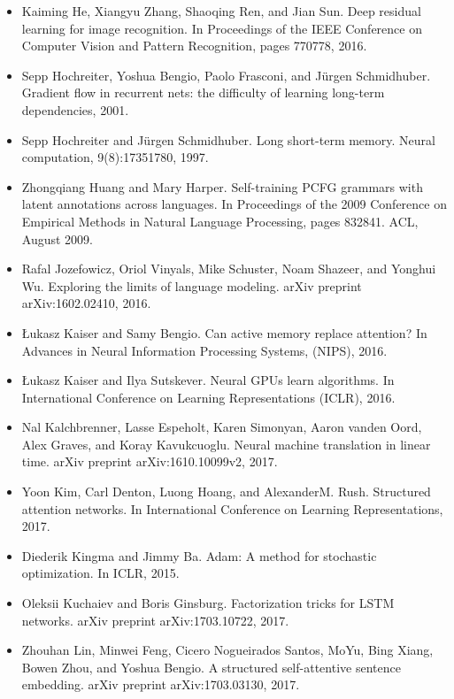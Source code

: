 \documentclass[11pt,a4paper]{article}
\begin{document}
\begin{itemize}
\item [he2016deep] Kaiming He, Xiangyu Zhang, Shaoqing Ren, and Jian Sun. Deep residual learning for image recognition. In Proceedings of the IEEE Conference on Computer Vision and Pattern Recognition, pages 770778, 2016.
\item [hochreiter2001gradient] Sepp Hochreiter, Yoshua Bengio, Paolo Frasconi, and Jürgen Schmidhuber. Gradient flow in recurrent nets: the difficulty of learning long-term dependencies, 2001.
\item [hochreiter1997] Sepp Hochreiter and Jürgen Schmidhuber. Long short-term memory. Neural computation, 9(8):17351780, 1997.
\item [huang-harper:2009:EMNLP] Zhongqiang Huang and Mary Harper. Self-training PCFG grammars with latent annotations across languages. In Proceedings of the 2009 Conference on Empirical Methods in Natural Language Processing, pages 832841. ACL, August 2009.
\item [jozefowicz2016exploring] Rafal Jozefowicz, Oriol Vinyals, Mike Schuster, Noam Shazeer, and Yonghui Wu. Exploring the limits of language modeling. arXiv preprint arXiv:1602.02410, 2016.
\item [extendedngpu] Łukasz Kaiser and Samy Bengio. Can active memory replace attention? In Advances in Neural Information Processing Systems, (NIPS), 2016.
\item [neural\_gpu] Łukasz Kaiser and Ilya Sutskever. Neural GPUs learn algorithms. In International Conference on Learning Representations (ICLR), 2016.
\item [NalBytenet2017] Nal Kalchbrenner, Lasse Espeholt, Karen Simonyan, Aaron vanden Oord, Alex Graves, and Koray Kavukcuoglu. Neural machine translation in linear time. arXiv preprint arXiv:1610.10099v2, 2017.
\item [structuredAttentionNetworks] Yoon Kim, Carl Denton, Luong Hoang, and AlexanderM. Rush. Structured attention networks. In International Conference on Learning Representations, 2017.
\item [kingma2014adam] Diederik Kingma and Jimmy Ba. Adam: A method for stochastic optimization. In ICLR, 2015.
\item [Kuchaiev2017Factorization] Oleksii Kuchaiev and Boris Ginsburg. Factorization tricks for LSTM networks. arXiv preprint arXiv:1703.10722, 2017.
\item [lin2017structured] Zhouhan Lin, Minwei Feng, Cicero Nogueirados Santos, MoYu, Bing Xiang, Bowen Zhou, and Yoshua Bengio. A structured self-attentive sentence embedding. arXiv preprint arXiv:1703.03130, 2017.

\end{itemize}
\end{document}
